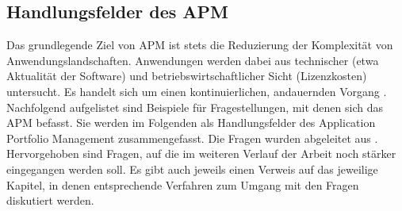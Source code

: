 \subsection {Handlungsfelder des APM}
Das grundlegende Ziel von APM ist stets die Reduzierung der Komplexität von Anwendungslandschaften. Anwendungen werden dabei aus technischer (etwa Aktualität der Software) und betriebswirtschaftlicher Sicht (Lizenzkosten) untersucht. Es handelt sich um einen kontinuierlichen, andauernden Vorgang \cite{schoder}. Nachfolgend aufgelistet sind Beispiele für Fragestellungen, mit denen sich das APM befasst. Sie werden im Folgenden als Handlungsfelder des Application Portfolio Management zusammengefasst. Die Fragen wurden abgeleitet aus \cite{apm}. Hervorgehoben sind Fragen, auf die im weiteren Verlauf der Arbeit noch stärker eingegangen werden soll. Es gibt auch jeweils einen Verweis auf das jeweilige Kapitel, in denen entsprechende Verfahren zum Umgang mit den Fragen diskutiert werden.

